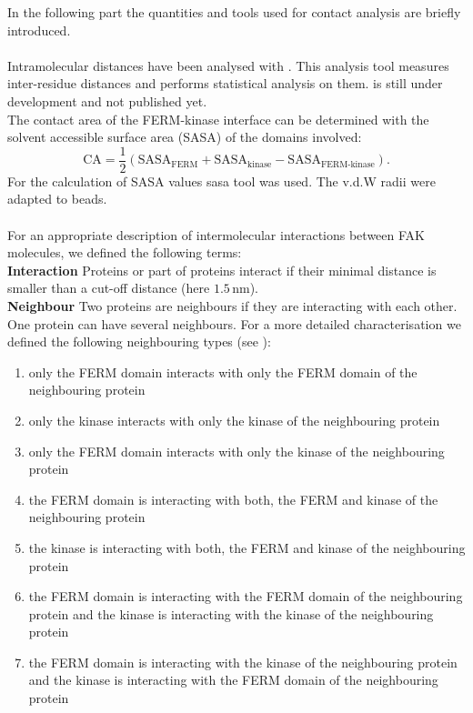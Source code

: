 In the following part the quantities and tools used for contact analysis are briefly introduced.\\
\\
Intramolecular distances have been analysed with \conan{}. This analysis tool measures inter-residue distances and performs statistical analysis on them. \conan{} is still under development and not published yet.\\
The contact area of the FERM-kinase interface can be determined with the solvent accessible surface area (SASA) \autocite{sasaAlg} of the domains involved:
\begin{equation}
\text{CA} = \frac{1}{2} \left(\text{SASA}_\text{FERM} + \text{SASA}_\text{kinase} - \text{SASA}_\text{FERM-kinase}\right).
\end{equation}
For the calculation of SASA values \gromacs{} sasa tool was used. The v.d.W radii were adapted to \martini{} beads.\\
\\
For an appropriate description of intermolecular interactions between FAK molecules, we defined the following terms:\\
\textbf{Interaction} Proteins or part of proteins interact if their minimal distance is smaller than a cut-off distance (here $1.5\,\si{\nano\metre}$).\\
\textbf{Neighbour} Two proteins are neighbours if they are interacting with each other. One protein can have several neighbours. For a more detailed characterisation we defined the following neighbouring types (see ):
\begin{enumerate}[label={type \theenumi:}, leftmargin=*]
	\setcounter{enumi}{0}
	\item only the FERM domain interacts with only the FERM domain of the neighbouring protein
	\item only the kinase interacts with only the kinase of the neighbouring protein
	\item only the FERM domain interacts with only the kinase of the neighbouring protein
	\item the FERM domain is interacting with both, the FERM and kinase of the neighbouring protein
	\item the kinase is interacting with both, the FERM and kinase of the neighbouring protein
	\item the FERM domain is interacting with the FERM domain of the neighbouring protein and the kinase is interacting with the kinase of the neighbouring protein
	\item the FERM domain is interacting with the kinase of the neighbouring protein and the kinase is interacting with the FERM domain of the neighbouring protein
\end{enumerate}
